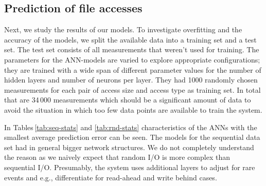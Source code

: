 \documentclass{superfri}
\begin{document}
	\subsection{Prediction of file accesses}
	Next, we study the results of our models.
	To investigate overfitting and the accuracy of the models, we split the available data into a training set and a test set. 
	The test set consists of all measurements that weren't used for training.
	The parameters for the ANN-models are varied to explore appropriate configurations; they are trained with a wide span of different parameter values for the number of hidden layers and number of neurons per layer.
	They had 1000 randomly chosen measurements for each pair of access size and access type as training set.
	In total that are 34\,000 measurements which should be a significant amount of data to avoid the situation in which too few data points are available to train the system. 
	
	\medskip
	
	In Tables\,\ref{tab:seq-stats} and \ref{tab:rnd-stats} characteristics of the ANNs with the smallest average prediction error can be seen.
	The models for the sequential data set had in general bigger network structures.
	We do not completely understand the reason as we naively expect that random I/O is more complex than sequential I/O.
	Presumably, the system uses additional layers to adjust for rare events and e.g., differentiate for read-ahead and write behind cases.
	
\end{document}
